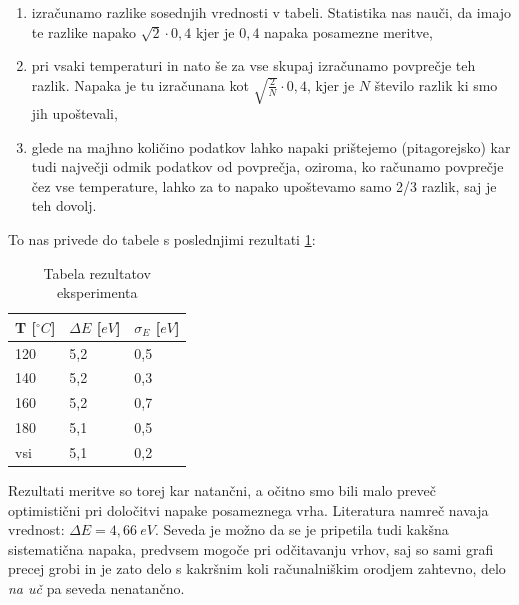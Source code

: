 \documentclass[10pt]{article}
\begin{document}
\begin{enumerate}
    \item izračunamo razlike sosednjih vrednosti v tabeli. Statistika nas nauči, da imajo te razlike napako $\sqrt{2} \cdot 0,4$ kjer je $0,4$ napaka posamezne meritve,
    \item pri vsaki temperaturi in nato še za vse skupaj izračunamo povprečje teh razlik. Napaka je tu izračunana kot $\sqrt{\frac{2}{N}}\cdot 0,4$, kjer je $N$ število razlik ki smo jih upoštevali,
    \item glede na majhno količino podatkov lahko napaki prištejemo (pitagorejsko) kar tudi največji odmik podatkov od povprečja, oziroma, ko računamo povprečje čez vse temperature, lahko za to napako upoštevamo samo 2/3 razlik, saj je teh dovolj.
\end{enumerate}

To nas privede do tabele s poslednjimi rezultati \ref{rezultati}:

\begin{table}[h]
    \begin{center}
    \begin{tabular}{l|l|l}
    T [$^{\circ}C$]  & $\Delta E$  [$eV$] & $\sigma_E$ [$eV$] \\ \hline
    120 & 5,2 & 0,5   \\
    140 & 5,2 & 0,3   \\
    160 & 5,2 & 0,7   \\
    180 & 5,1 & 0,5   \\
    vsi & 5,1 & 0,2  
    \end{tabular}
    \caption{Tabela rezultatov eksperimenta}
    \label{rezultati}
    \end{center}
\end{table}


Rezultati meritve so torej kar natančni, a očitno smo bili malo preveč optimistični pri določitvi napake posameznega vrha. Literatura namreč navaja vrednost: $\Delta E = 4,66\ eV$. Seveda je možno da se je pripetila tudi kakšna sistematična napaka, predvsem mogoče pri odčitavanju vrhov, saj so sami grafi precej grobi in je zato delo s kakršnim koli računalniškim orodjem zahtevno, delo \textit{na uč} pa seveda nenatančno.
\end{document}
